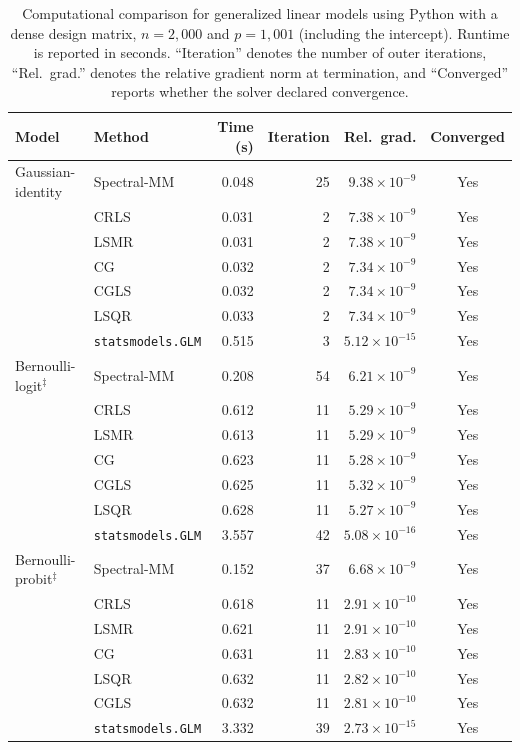 
\begin{table}[htbp]
\centering
\small
\setlength{\tabcolsep}{4pt}
\caption{
Computational comparison for generalized linear models using Python with a dense design matrix,
$n=2{,}000$ and $p=1{,}001$ (including the intercept).
Runtime is reported in seconds. ``Iteration\textquotedblright{} denotes the number of outer iterations,
``Rel.\ grad.\textquotedblright{} denotes the relative gradient norm at termination, and
``Converged\textquotedblright{} reports whether the solver declared convergence.}
\label{tab:python-glm-comparison-dense}
\begin{tabular}{llrrrc}
\toprule
Model & Method & Time (s) & Iteration & Rel.\ grad. & Converged \\
\midrule

Gaussian-identity
& Spectral-MM & 0.048 & 25 & $9.38\times10^{-9}$ & Yes \\
& CRLS & 0.031 & 2 & $7.38\times10^{-9}$ & Yes \\
& LSMR & 0.031 & 2 & $7.38\times10^{-9}$ & Yes \\
& CG & 0.032 & 2 & $7.34\times10^{-9}$ & Yes \\
& CGLS & 0.032 & 2 & $7.34\times10^{-9}$ & Yes \\
& LSQR & 0.033 & 2 & $7.34\times10^{-9}$ & Yes \\
& \texttt{statsmodels.GLM} & 0.515 & 3 & $5.12\times10^{-15}$ & Yes \\
\midrule

Bernoulli-logit$^{\ddagger}$
& Spectral-MM & 0.208 & 54 & $6.21\times10^{-9}$ & Yes \\
& CRLS & 0.612 & 11 & $5.29\times10^{-9}$ & Yes \\
& LSMR & 0.613 & 11 & $5.29\times10^{-9}$ & Yes \\
& CG & 0.623 & 11 & $5.28\times10^{-9}$ & Yes \\
& CGLS & 0.625 & 11 & $5.32\times10^{-9}$ & Yes \\
& LSQR & 0.628 & 11 & $5.27\times10^{-9}$ & Yes \\
& \texttt{statsmodels.GLM} & 3.557 & 42 & $5.08\times10^{-16}$ & Yes \\
\midrule

Bernoulli-probit$^{\ddagger}$
& Spectral-MM & 0.152 & 37 & $6.68\times10^{-9}$ & Yes \\
& CRLS & 0.618 & 11 & $2.91\times10^{-10}$ & Yes \\
& LSMR & 0.621 & 11 & $2.91\times10^{-10}$ & Yes \\
& CG & 0.631 & 11 & $2.83\times10^{-10}$ & Yes \\
& LSQR & 0.632 & 11 & $2.82\times10^{-10}$ & Yes \\
& CGLS & 0.632 & 11 & $2.81\times10^{-10}$ & Yes \\
& \texttt{statsmodels.GLM} & 3.332 & 39 & $2.73\times10^{-15}$ & Yes \\
\midrule


\end{tabular}
\end{table}

